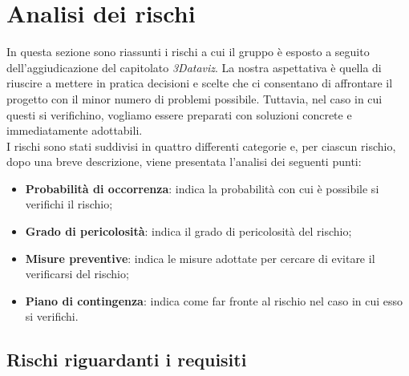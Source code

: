 \section{Analisi dei rischi}
In questa sezione sono riassunti i rischi a cui il gruppo è esposto a seguito dell'aggiudicazione del capitolato \textit{3Dataviz}.
La nostra aspettativa è quella di riuscire a mettere in pratica decisioni e scelte che ci consentano di affrontare il progetto con il minor numero di problemi possibile.
Tuttavia, nel caso in cui questi si verifichino, vogliamo essere preparati con soluzioni concrete e immediatamente adottabili.
\\I rischi sono stati suddivisi in quattro differenti categorie e, per ciascun rischio, dopo una breve descrizione, viene presentata l'analisi dei seguenti punti:
\begin{itemize}
    \item \textbf{Probabilità di occorrenza}: indica la probabilità con cui è possibile si verifichi il rischio;
    \item \textbf{Grado di pericolosità}: indica il grado di pericolosità del rischio;
    \item \textbf{Misure preventive}: indica le misure adottate per cercare di evitare il verificarsi del rischio;
    \item \textbf{Piano di contingenza}: indica come far fronte al rischio nel caso in cui esso si verifichi. 
\end{itemize}
\subsection{Rischi riguardanti i requisiti}

